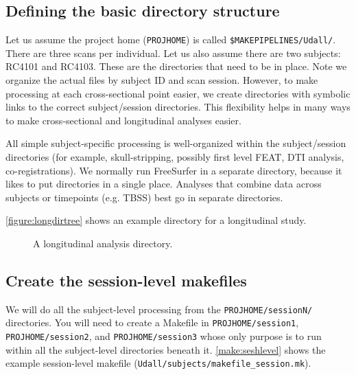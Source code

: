 \subsection{Defining the basic directory structure}
Let us assume the project home (\texttt{PROJHOME}) is called \texttt{\$MAKEPIPELINES/Udall/}. There are three scans per individual. Let us also assume there are two subjects: RC4101 and RC4103. These are the directories that need to be in place. Note we organize the actual files by subject ID and scan session. However, to make processing at each cross-sectional point easier, we create directories with symbolic links to the correct subject/session directories. This flexibility helps in many ways to make cross-sectional and longitudinal analyses easier.

All simple subject-specific processing is well-organized within the subject/session directories (for example, skull-stripping, possibly first level FEAT, DTI analysis, co-registrations). We normally run FreeSurfer in a separate directory, because it likes to put directories in a single place. Analyses that combine data across subjects or timepoints (e.g. TBSS) best go in separate directories.

\autoref{figure:longdirtree} shows an example directory for a longitudinal study.

\begin{center}
	\begin{figure}
	\caption{A longitudinal analysis directory.}
	\label{figure:longdirtree}
	\end{figure}
\end{center}

\subsection{Create the session-level makefiles}
We will do all the subject-level processing from the \texttt{PROJHOME/sessionN/} directories. You will need to create a Makefile in \texttt{PROJHOME/session1}, \texttt{PROJHOME/session2}, and \texttt{PROJHOME/session3} whose only purpose is to run \maken{} within all the subject-level directories beneath it.  
\autoref{make:seshlevel} shows the example session-level makefile (\texttt{Udall/subjects/makefile_session.mk}).


